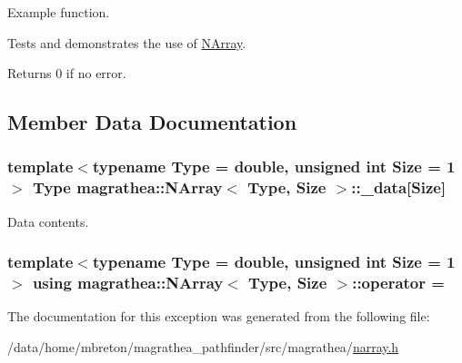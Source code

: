 Example function. 

Tests and demonstrates the use of \hyperlink{exceptionmagrathea_1_1NArray}{N\-Array}. \begin{DoxyReturn}{Returns}
0 if no error. 
\end{DoxyReturn}


\subsection{Member Data Documentation}
\hypertarget{exceptionmagrathea_1_1NArray_a9bc055609b16d71846679d87b367934c}{
\subsubsection[{\-\_\-data}]{\setlength{\rightskip}{0pt plus 5cm}template$<$typename Type = double, unsigned int Size = 1$>$ Type {\bf magrathea\-::\-N\-Array}$<$ Type, Size $>$\-::\-\_\-data\mbox{[}Size\mbox{]}\hspace{0.3cm}{\ttfamily [protected]}}}\label{exceptionmagrathea_1_1NArray_a9bc055609b16d71846679d87b367934c}


Data contents. 

\hypertarget{exceptionmagrathea_1_1NArray_aa6eab16c5ba3cc719553a2465f0319df}{
\subsubsection[{operator}]{\setlength{\rightskip}{0pt plus 5cm}template$<$typename Type = double, unsigned int Size = 1$>$ using {\bf magrathea\-::\-N\-Array}$<$ Type, Size $>$\-::operator = }}\label{exceptionmagrathea_1_1NArray_aa6eab16c5ba3cc719553a2465f0319df}


The documentation for this exception was generated from the following file\-:\begin{DoxyCompactItemize}
\item 
/data/home/mbreton/magrathea\-\_\-pathfinder/src/magrathea/\hyperlink{narray_8h}{narray.\-h}\end{DoxyCompactItemize}
